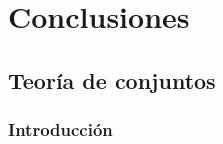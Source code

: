 \documentclass[../proyecto.tex]{memoir}
\begin{document}
\chapter{Conclusiones}

\section{Teoría de conjuntos}

\subsection{Introducción}
\end{document}
